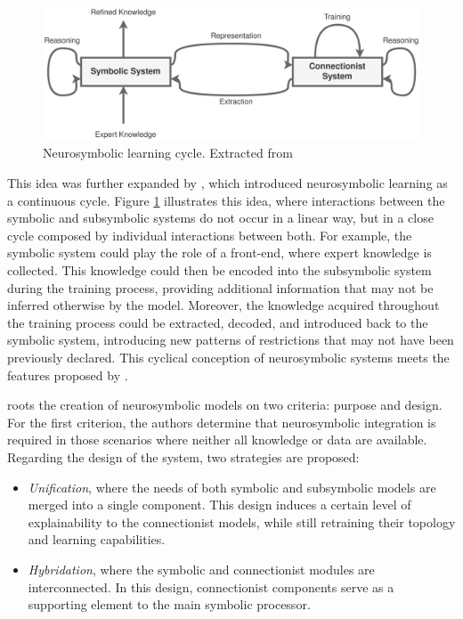 \begin{figure}
    \centering
    \includegraphics[width=\linewidth]{3_stateoftheart/figures/Neurosymbolic_Bader.eps}
    \caption{Neurosymbolic learning cycle. Extracted from \cite{bader_dimensions_2005}}
    \label{fig:neuro_cycle}
\end{figure}

This idea was further expanded by \cite{bader_dimensions_2005}, which introduced neurosymbolic learning as a continuous cycle. Figure \ref{fig:neuro_cycle} illustrates this idea, where interactions between the symbolic and subsymbolic systems do not occur in a linear way, but in a close cycle composed by individual interactions between both. For example, the symbolic system could play the role of a front-end, where expert knowledge is collected. This knowledge could then be encoded into the subsymbolic system during the training process, providing additional information that may not be inferred otherwise by the model. Moreover, the knowledge acquired throughout the training process could be extracted, decoded, and introduced back to the symbolic system, introducing new patterns of restrictions that may not have been previously declared. This cyclical conception of neurosymbolic systems meets the features proposed by \cite{mcgarry_hybrid_1999}.

\cite{mira_neurosymbolic_2004} roots the creation of neurosymbolic models on two criteria: purpose and design. For the first criterion, the authors determine that neurosymbolic integration is required in those scenarios where neither all knowledge or data are available. Regarding the design of the system, two strategies are proposed:
\begin{itemize}
    \item \textit{Unification}, where the needs of both symbolic and subsymbolic models are merged into a single component. This design induces a certain level of explainability to the connectionist models, while still retraining their topology and learning capabilities.
    
    \item \textit{Hybridation}, where the symbolic and connectionist modules are interconnected. In this design, connectionist components serve as a supporting element to the main symbolic processor.
\end{itemize}

